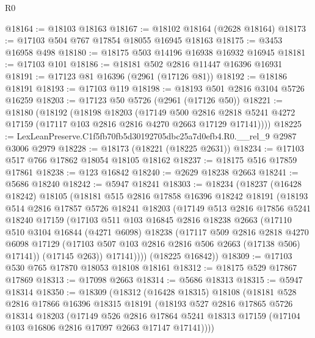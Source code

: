 \begin{lexlean}{R0}
\begin{coremodule}
@18164 := @18103 @18163
@18167 := @18102 @18164 (@2628 @18164)
@18173 := @17103 @504 @767 @17854 @18055 @16945 @18163
@18175 := @3453 @16958 @498
@18180 := @18175 @503 @14196 @16938 @16932 @16945
@18181 := @17103 @101
@18186 := @18181 @502 @2816 @11447 @16396 @16931
@18191 := @17123 @81 @16396 (@2961 (@17126 @81))
@18192 := @18186 @18191
@18193 := @17103 @119
@18198 := @18193 @501 @2816 @3104 @5726 @16259
@18203 := @17123 @50 @5726 (@2961 (@17126 @50))
@18221 := @18180
    (@18192
      (@18198
        @18203
        (@17149
          @500
          @2816
          @2818
          @5241
          @4272
          @17159
          (@17117 @103 @2816 @2816 @4270 @2663 @17129 @17141))))
@18225 := LexLeanPreserve.C1f5fb70fb5d30192705dbc25a7d0efb4.R0.__rel_9 @2987 @3006 @2979
@18228 := @18173 (@18221 (@18225 @2631))
@18234 := @17103 @517 @766 @17862 @18054 @18105 @18162
@18237 := @18175 @516 @17859 @17861
@18238 := @123 @16842
@18240 := @2629 @18238 @2663
@18241 := @5686 @18240
@18242 := @5947 @18241
@18303 := @18234
    (@18237
      (@16428 @18242)
      @18105
      (@18181
        @515
        @2816
        @17858
        @16396
        @18242
        @18191
        (@18193
          @514
          @2816
          @17857
          @5726
          @18241
          @18203
          (@17149
            @513
            @2816
            @17856
            @5241
            @18240
            @17159
            (@17103
              @511
              @103
              @16845
              @2816
              @18238
              @2663
              (@17110
                @510
                @3104
                @16844
                (@4271 @6098)
                @18238
                (@17117
                  @509
                  @2816
                  @2818
                  @4270
                  @6098
                  @17129
                  (@17103 @507 @103 @2816 @2816 @506 @2663 (@17138 @506) @17141))
                (@17145 @263))
              @17141))))
      (@18225 @16842))
@18309 := @17103 @530 @765 @17870 @18053 @18108 @18161
@18312 := @18175 @529 @17867 @17869
@18313 := @17098 @2663
@18314 := @5686 @18313
@18315 := @5947 @18314
@18350 := @18309
    (@18312
      (@16428 @18315)
      @18108
      (@18181
        @528
        @2816
        @17866
        @16396
        @18315
        @18191
        (@18193
          @527
          @2816
          @17865
          @5726
          @18314
          @18203
          (@17149
            @526
            @2816
            @17864
            @5241
            @18313
            @17159
            (@17104 @103 @16806 @2816 @17097 @2663 @17147 @17141))))

\end{coremodule}
\end{lexlean}
